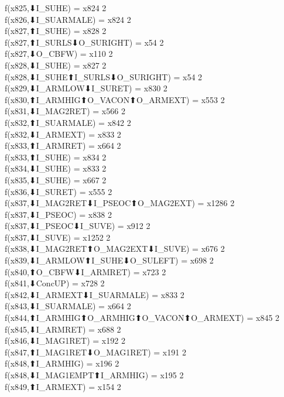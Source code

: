 f(x825,⬇I_SUHE) = x824 {2} \\
f(x826,⬇I_SUARMALE) = x824 {2} \\
f(x827,⬆I_SUHE) = x828 {2} \\
f(x827,⬆I_SURLS⬇O_SURIGHT) = x54 {2} \\
f(x827,⬇O_CBFW) = x110 {2} \\
f(x828,⬇I_SUHE) = x827 {2} \\
f(x828,⬇I_SUHE⬆I_SURLS⬇O_SURIGHT) = x54 {2} \\
f(x829,⬇I_ARMLOW⬇I_SURET) = x830 {2} \\
f(x830,⬆I_ARMHIG⬆O_VACON⬆O_ARMEXT) = x553 {2} \\
f(x831,⬇I_MAG2RET) = x566 {2} \\
f(x832,⬆I_SUARMALE) = x842 {2} \\
f(x832,⬇I_ARMEXT) = x833 {2} \\
f(x833,⬆I_ARMRET) = x664 {2} \\
f(x833,⬆I_SUHE) = x834 {2} \\
f(x834,⬇I_SUHE) = x833 {2} \\
f(x835,⬇I_SUHE) = x667 {2} \\
f(x836,⬇I_SURET) = x555 {2} \\
f(x837,⬇I_MAG2RET⬇I_PSEOC⬆O_MAG2EXT) = x1286 {2} \\
f(x837,⬇I_PSEOC) = x838 {2} \\
f(x837,⬇I_PSEOC⬇I_SUVE) = x912 {2} \\
f(x837,⬇I_SUVE) = x1252 {2} \\
f(x838,⬇I_MAG2RET⬆O_MAG2EXT⬇I_SUVE) = x676 {2} \\
f(x839,⬇I_ARMLOW⬆I_SUHE⬇O_SULEFT) = x698 {2} \\
f(x840,⬆O_CBFW⬇I_ARMRET) = x723 {2} \\
f(x841,⬇ConcUP) = x728 {2} \\
f(x842,⬇I_ARMEXT⬇I_SUARMALE) = x833 {2} \\
f(x843,⬇I_SUARMALE) = x664 {2} \\
f(x844,⬆I_ARMHIG⬆O_ARMHIG⬆O_VACON⬆O_ARMEXT) = x845 {2} \\
f(x845,⬇I_ARMRET) = x688 {2} \\
f(x846,⬇I_MAG1RET) = x192 {2} \\
f(x847,⬆I_MAG1RET⬇O_MAG1RET) = x191 {2} \\
f(x848,⬆I_ARMHIG) = x196 {2} \\
f(x848,⬇I_MAG1EMPT⬆I_ARMHIG) = x195 {2} \\
f(x849,⬆I_ARMEXT) = x154 {2} \\
